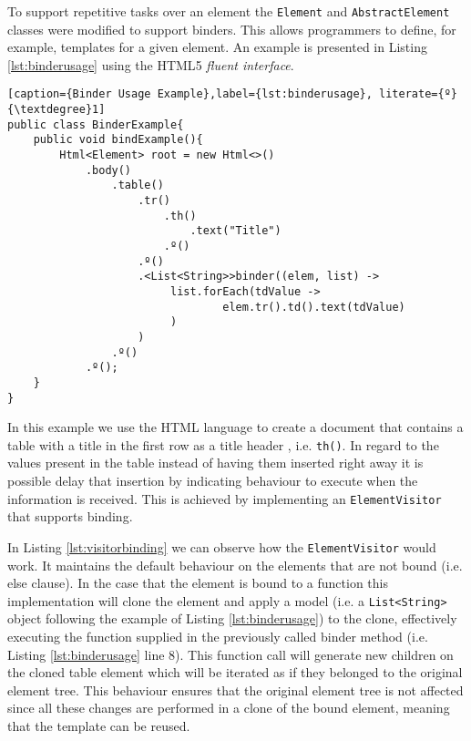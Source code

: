 \noindent
To support repetitive tasks over an element the \texttt{Element} and \texttt{AbstractElement} classes were modified to support binders. This allows programmers to define, for example, templates for a given element. An example is presented in Listing \ref{lst:binderusage} using the \ac{HTML}5 \textit{fluent interface}.

\bigskip


\begin{minipage}{\linewidth}
\begin{lstlisting}[caption={Binder Usage Example},label={lst:binderusage}, literate={º}{\textdegree}1]
public class BinderExample{
    public void bindExample(){
		Html<Element> root = new Html<>()
            .body()
                .table()
                    .tr()
                        .th()
                            .text("Title")
                        .º()
                    .º()
                    .<List<String>>binder((elem, list) ->
                         list.forEach(tdValue ->
                                 elem.tr().td().text(tdValue)
                         )
                    )
                .º()
            .º();
    }
}
\end{lstlisting}
\end{minipage}

\noindent
In this example we use the \ac{HTML} language to create a document that contains a table with a title in the first row as a title header , i.e. \texttt{th()}. In regard to the values present in the table instead of having them inserted right away it is possible delay that insertion by indicating behaviour to execute when the information is received. This is achieved by implementing an \texttt{ElementVisitor} that supports binding. 

\noindent
In Listing \ref{lst:visitorbinding} we can observe how the \texttt{ElementVisitor} would work. It maintains the default behaviour on the elements that are not bound (i.e. else clause). In the case that the element is bound to a function this implementation will clone the element and apply a model (i.e. a \texttt{List<String>} object following the example of Listing \ref{lst:binderusage}) to the clone, effectively executing the function supplied in the previously called binder method (i.e. Listing \ref{lst:binderusage} line 8). This function call will generate new children on the cloned table element which will be iterated as if they belonged to the original element tree. This behaviour ensures that the original element tree is not affected since all these changes are performed in a clone of the bound element, meaning that the template can be reused.


